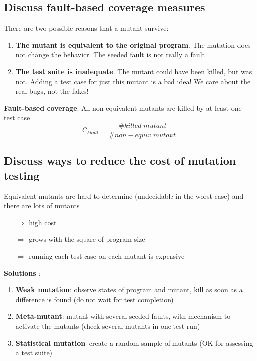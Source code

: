\documentclass{article}
\begin{document}
\subsection{Discuss fault-based
coverage measures}
\noindent There are two possible reasons that a mutant survive:
\begin{enumerate}
    \item \textbf{The mutant is equivalent to the original program}. The mutation does not change the behavior. The seeded fault is not really a fault

    \item \textbf{The test suite is inadequate}. The mutant could have been killed, but was not. Adding a test case for just this mutant is a bad idea! We care about the real bugs, not the fakes!\\
\end{enumerate}

\noindent \textbf{Fault-based coverage}: All non-equivalent mutants are killed by at least one test case
$$C_{Fault} = \frac{\#killed\;mutant}{\#non-equiv\;mutant}$$

\newpage
\subsection{Discuss ways to reduce the cost of mutation testing}
\noindent Equivalent mutants are hard to determine (undecidable in the worst case) and there are lots of mutants
\begin{itemize}
    \item [$\Rightarrow$]high cost
    \item [$\Rightarrow$]grows with the square of program size
    \item [$\Rightarrow$]running each test case on each mutant is expensive\\
\end{itemize}

\noindent \textbf{Solutions} : 
\begin{enumerate}
    \item \textbf{Weak mutation}: observe states of program and mutant, kill as soon as a difference is found (do
not wait for test completion)
    \item \textbf{Meta-mutant}: mutant with several seeded faults, with mechanism to activate the mutants (check
several mutants in one test run)
    \item \textbf{Statistical mutation}: create a random sample of mutants (OK for assessing a test suite)

\end{enumerate}
\end{document}
